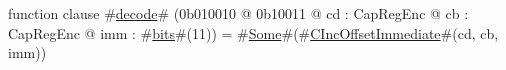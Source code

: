 function clause #\hyperref[zdecode]{decode}# (0b010010 @ 0b10011 @ cd : CapRegEnc @ cb : CapRegEnc @ imm : #\hyperref[zbits]{bits}#(11)) = #\hyperref[zSome]{Some}#(#\hyperref[zCIncOffsetImmediate]{CIncOffsetImmediate}#(cd, cb, imm))

